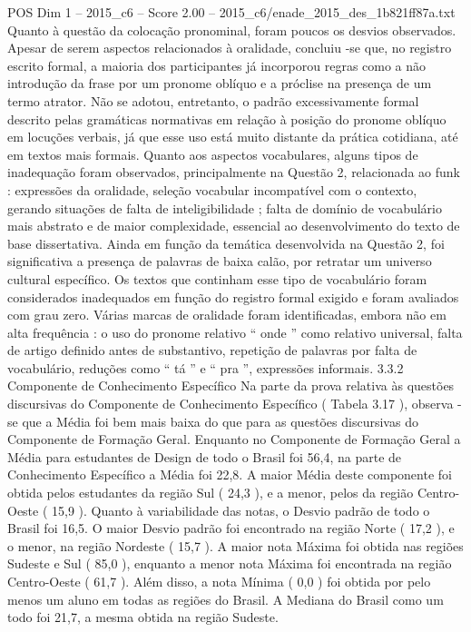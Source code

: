 \begin{textsample}{POS Dim 1 – 2015\_c6 – Score 2.00 – 2015\_c6/enade\_2015\_des\_1b821ff87a.txt}
Quanto à questão da colocação pronominal, foram poucos os desvios observados.
Apesar de serem aspectos relacionados à oralidade, concluiu -se que, no registro escrito formal, a maioria dos participantes já incorporou regras como a não introdução da frase por um pronome oblíquo e a próclise na presença de um termo atrator.
Não se adotou, entretanto, o padrão excessivamente formal descrito pelas gramáticas normativas em relação à posição do pronome oblíquo em locuções verbais, já que esse uso está muito distante da prática cotidiana, até em textos mais formais.
Quanto aos aspectos vocabulares, alguns tipos de inadequação foram observados, principalmente na Questão 2, relacionada ao funk : expressões da oralidade, seleção vocabular incompatível com o contexto, gerando situações de falta de inteligibilidade ; falta de domínio de vocabulário mais abstrato e de maior complexidade, essencial ao desenvolvimento do texto de base dissertativa.
Ainda em função da temática desenvolvida na Questão 2, foi significativa a presença de palavras de baixa calão, por retratar um universo cultural específico.
Os textos que continham esse tipo de vocabulário foram considerados inadequados em função do registro formal exigido e foram avaliados com grau zero.
Várias marcas de oralidade foram identificadas, embora não em alta frequência : o uso do pronome relativo “ onde ” como relativo universal, falta de artigo definido antes de substantivo, repetição de palavras por falta de vocabulário, reduções como “ tá ” e “ pra ”, expressões informais. 3.3.2 Componente de Conhecimento Específico Na parte da prova relativa às questões discursivas do Componente de Conhecimento Específico ( Tabela 3.17 ), observa -se que a Média foi bem mais baixa do que para as questões discursivas do Componente de Formação Geral.
Enquanto no Componente de Formação Geral a Média para estudantes de Design de todo o Brasil foi 56,4, na parte de Conhecimento Específico a Média foi 22,8.
A maior Média deste componente foi obtida pelos estudantes da região Sul ( 24,3 ), e a menor, pelos da região Centro-Oeste ( 15,9 ).
Quanto à variabilidade das notas, o Desvio padrão de todo o Brasil foi 16,5.
O maior Desvio padrão foi encontrado na região Norte ( 17,2 ), e o menor, na região Nordeste ( 15,7 ).
A maior nota Máxima foi obtida nas regiões Sudeste e Sul ( 85,0 ), enquanto a menor nota Máxima foi encontrada na região Centro-Oeste ( 61,7 ).
Além disso, a nota Mínima ( 0,0 ) foi obtida por pelo menos um aluno em todas as regiões do Brasil.
A Mediana do Brasil como um todo foi 21,7, a mesma obtida na região Sudeste.

\end{textsample}
